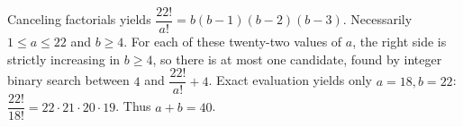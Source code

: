Canceling factorials yields $\dfrac{22!}{a!}=b(b-1)(b-2)(b-3)$. Necessarily $1\le a\le22$ and $b\ge4$. For each of these twenty-two values of $a$, the right side is strictly increasing in $b\ge4$, so there is at most one candidate, found by integer binary search between $4$ and $\dfrac{22!}{a!}+4$. Exact evaluation yields only $a=18,b=22$: $\dfrac{22!}{18!}=22\cdot21\cdot20\cdot19$. Thus $\boxed{a+b=40}$.

